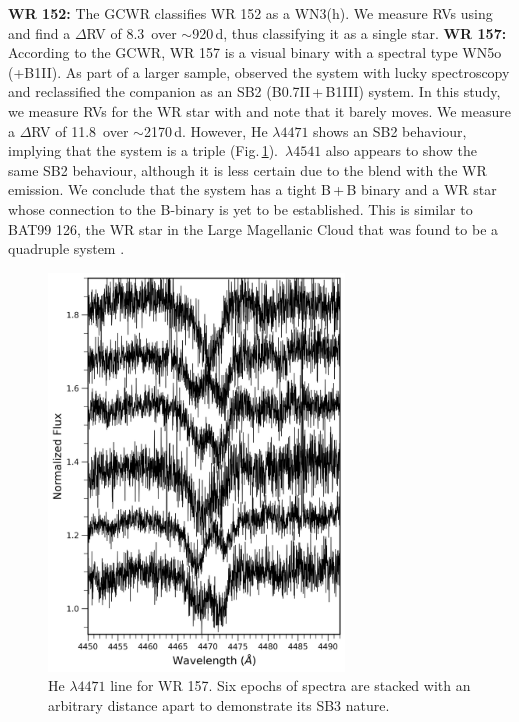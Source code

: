 \newline
\newline
\textbf{WR 152:} The GCWR classifies WR 152 as a WN3(h). We measure RVs using \NVred{} and find a $\Delta$RV of 8.3\,\kms{} over ${\sim}$920\,d, thus classifying it as a single star. 
\newline
\newline
\textbf{WR 157:} According to the GCWR, WR 157 is a visual binary with a spectral type WN5o\,(+B1II). As part of a larger sample, \citet{2021MaizAppelaniz} observed the system with lucky spectroscopy and reclassified the companion as an SB2 (B0.7II\,+\,B1III) system. In this study, we measure RVs for the WR star with \NVblue{} and note that it barely moves. We measure a $\Delta$RV of 11.8\,\kms{} over ${\sim}$2170\,d. However, He\,{}\,$\lambda 4471$ shows an SB2 behaviour, implying that the system is a triple (Fig.\,\ref{fig:WR157_he1}). 
\heii\,$\lambda 4541$ also appears to show the same SB2 behaviour, although it is less certain due to the blend with the WR emission. We conclude that the system has a tight B\,+\,B binary and a WR star whose connection to the B-binary is yet to be established. This is similar to BAT99 126, the WR star in the Large Magellanic Cloud that was found to be a quadruple system \citep{2021Janssens}. 
\newline
\newline
\begin{figure}
    \centering
    \includegraphics[width=0.7\textwidth]{chapters/WNE/image/WR157_he1_bw.png}
    \caption{He\,{}\,$\lambda 4471$ line for WR 157. Six epochs of spectra are stacked with an arbitrary distance apart to demonstrate its SB3 nature.}
    \label{fig:WR157_he1}
\end{figure}
